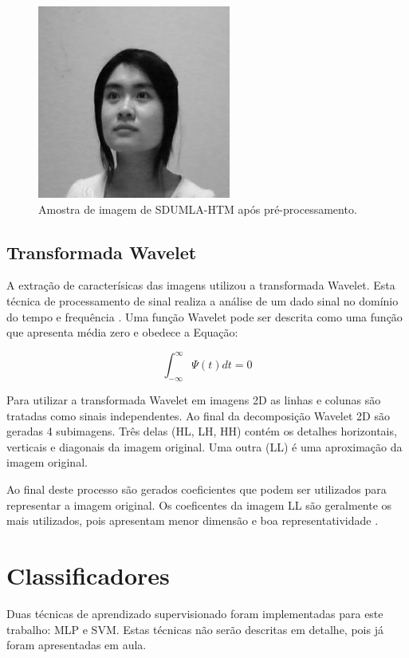 \documentclass[conference]{IEEEtran}
\begin{document}
\begin{figure}[!t]
\centering
\includegraphics[width=2.5in]{sdumla_sample}
\caption{Amostra de imagem de SDUMLA-HTM após pré-processamento.}
\label{fig_sdumlahtm_sample}
\end{figure}

\subsection{Transformada Wavelet}
A extração de caracterísicas das imagens utilizou a transformada Wavelet. Esta técnica de processamento de sinal realiza a análise de um dado sinal no domínio do tempo e frequência \cite{costa2011ensemble}. Uma função Wavelet pode ser descrita como uma função que apresenta média zero e obedece a Equação:

\[\int_{-\infty}^{\infty} \Psi(t)dt = 0\]

Para utilizar a transformada Wavelet em imagens 2D as linhas e colunas são tratadas como sinais independentes. Ao final da decomposição Wavelet 2D são geradas 4 subimagens. Três delas (HL, LH, HH) contém os detalhes horizontais, verticais e diagonais da imagem original. Uma outra (LL) é uma aproximação da imagem original.

Ao final deste processo são gerados coeficientes que podem ser utilizados para representar a imagem original. Os coeficentes da imagem LL são geralmente os mais utilizados, pois apresentam menor dimensão e boa representatividade \cite{burrus1997introduction}.

\section{Classificadores}
Duas técnicas de aprendizado supervisionado foram implementadas para este trabalho: MLP e SVM. Estas técnicas não serão descritas em detalhe, pois já foram apresentadas em aula.
\end{document}
